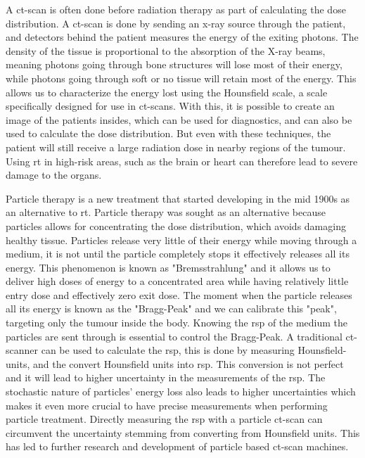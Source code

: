 \documentclass[main.tex]{subfiles}
\begin{document}
A \gls{ct}-scan is often done before radiation therapy as part of calculating the dose distribution. A \gls{ct}-scan is done by sending an x-ray source through the patient, and detectors behind the patient measures the energy of the exiting photons. The density of the tissue is proportional to the absorption of the X-ray beams, meaning photons going through bone structures will lose most of their energy, while photons going through soft or no tissue will retain most of the energy. This allows us to characterize the energy lost using the Hounsfield scale, a scale specifically designed for use in \gls{ct}-scans. With this, it is possible to create an image of the patients insides, which can be used for diagnostics, and can also be used to calculate the dose distribution. But even with these techniques, the patient will still receive a large radiation dose in nearby regions of the tumour. Using \gls{rt} in high-risk areas, such as the brain or heart can therefore lead to severe damage to the organs.  \par

Particle therapy is a new treatment that started developing in the mid 1900s as an alternative to \gls{rt}. Particle therapy was sought as an alternative because particles allows for  concentrating the dose distribution, which avoids damaging healthy tissue. Particles release very little of their energy while moving through a medium, it is not until the particle completely stops it effectively releases all its energy. This phenomenon is known as "Bremsstrahlung" and it allows us to deliver high doses of energy to a concentrated area while having relatively little entry dose and effectively zero exit dose. The moment when the particle releases all its energy is known as the "Bragg-Peak" and we can calibrate this "peak", targeting only the tumour inside the body. Knowing the \gls{rsp} of the medium the particles are sent through is essential to control the Bragg-Peak. A traditional \gls{ct}-scanner can be used to calculate the \gls{rsp}, this is done by measuring Hounsfield-units, and the convert Hounsfield units into \gls{rsp}. This conversion is not perfect and it will lead to higher uncertainty in the measurements of the \gls{rsp}. The stochastic nature of particles' energy loss also leads to higher uncertainties which makes it even more crucial to have precise measurements when performing particle treatment. Directly measuring the \gls{rsp} with a particle \gls{ct}-scan can circumvent the uncertainty stemming from converting from Hounsfield units. This has led to further research and development of particle based \gls{ct}-scan machines.
\end{document}
